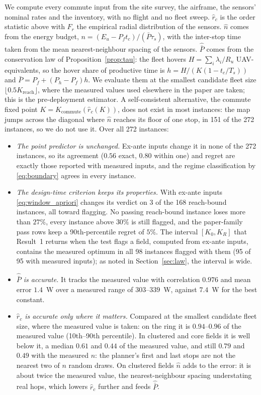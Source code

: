 \documentclass[journal,outdir=./]{IEEEtran}
\newcommand{\Kr}{K_{\mathrm{reach}}}
\newcommand{\Kc}{K_{\mathrm{commute}}}
\newcommand{\rc}{r_{c}}
\newcommand{\Pbar}{\bar{P}}
\newcommand{\Pf}{P_{f}}
\newcommand{\Ph}{P_{h}}
\newcommand{\Eu}{E_{u}}
\newcommand{\Ru}{R_u}
\begin{document}
We compute every commute input from the site survey, the airframe, the sensors' nominal rates and the inventory, with no flight and no fleet sweep. $\hat\rc$ is the order statistic above with $F_r$ the empirical radial distribution of the sensors. $\hat n$ comes from the energy budget, $n=(\Eu-\Pf t_c)/(\Pbar\tau_s)$, with the inter-stop time taken from the mean nearest-neighbour spacing of the sensors. $\hat{\Pbar}$ comes from the conservation law of Proposition~\ref{prop:tau}: the fleet hovers $H=\sum_i\lambda_i/\Ru$ UAV-equivalents, so the hover share of productive time is $h=H/(K(1-t_c/T_s))$ and $\Pbar=\Pf+(\Ph-\Pf)h$. We evaluate them at the smallest candidate fleet size $\lfloor0.5\Kr\rfloor$, where the measured values used elsewhere in the paper are taken; this is the pre-deployment estimator. A self-consistent alternative, the commute fixed point $K=\Kc(\hat\rc(K))$, does not exist in most instances: the map jumps across the diagonal where $\hat n$ reaches its floor of one stop, in 151 of the 272 instances, so we do not use it. Over all 272 instances:
\begin{itemize}
\item \emph{The point predictor is unchanged.} Ex-ante inputs change it in none of the 272 instances, so its agreement ($0.56$ exact, $0.80$ within one) and regret are exactly those reported with measured inputs, and the regime classification by \eqref{eq:boundary} agrees in every instance.
\item \emph{The design-time criterion keeps its properties.} With ex-ante inputs \eqref{eq:window_apriori} changes its verdict on 3 of the 168 reach-bound instances, all toward flagging. No passing reach-bound instance loses more than $27\%$, every instance above $30\%$ is still flagged, and the paper-family pass rows keep a 90th-percentile regret of $5\%$. The interval $[K_0,K_R]$ that Result~1 returns when the test flags a field, computed from ex-ante inputs, contains the measured optimum in all 98 instances flagged with them (95 of 95 with measured inputs); as noted in Section~\ref{sec:law}, the interval is wide.
\item \emph{$\hat{\Pbar}$ is accurate.} It tracks the measured value with correlation $0.976$ and mean error $1.4$~W over a measured range of $303$--$339$~W, against $7.4$~W for the best constant.
\item \emph{$\hat\rc$ is accurate only where it matters.} Compared at the smallest candidate fleet size, where the measured value is taken: on the ring it is $0.94$--$0.96$ of the measured value (10th--90th percentile). In clustered and core fields it is well below it, a median $0.61$ and $0.44$ of the measured value, and still $0.79$ and $0.49$ with the measured $n$: the planner's first and last stops are not the nearest two of $n$ random draws. On clustered fields $\hat n$ adds to the error: it is about twice the measured value, the nearest-neighbour spacing understating real hops, which lowers $\hat\rc$ further and feeds $\hat{\Pbar}$.
\end{itemize}
\end{document}
